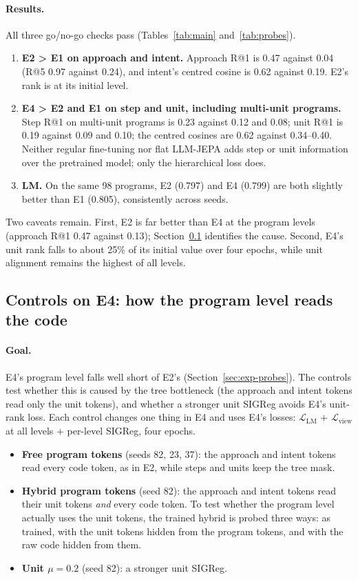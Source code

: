 \documentclass[11pt]{article}
\newcommand{\Lcal}{\mathcal{L}}
\begin{document}
\paragraph{Results.} All three go/no-go checks pass (Tables~\ref{tab:main} and~\ref{tab:probes}).
\begin{enumerate}
  \item \textbf{E2 > E1 on approach and intent.} Approach R@1 is 0.47 against 0.04 (R@5 0.97 against 0.24), and
        intent's centred cosine is 0.62 against 0.19. E2's rank is at its initial level.
  \item \textbf{E4 > E2 and E1 on step and unit, including multi-unit programs.} Step R@1 on multi-unit programs is
        0.23 against 0.12 and 0.08; unit R@1 is 0.19 against 0.09 and 0.10; the centred cosines are 0.62 against
        0.34--0.40. Neither regular fine-tuning nor flat LLM-JEPA adds step or unit information over the pretrained
        model; only the hierarchical loss does.
  \item \textbf{LM.} On the same 98 programs, E2 (0.797) and E4 (0.799) are both slightly better than E1 (0.805),
        consistently across seeds.
\end{enumerate}

Two caveats remain. First, E2 is far better than E4 at the program levels (approach R@1 0.47 against 0.13);
Section~\ref{sec:exp-controls} identifies the cause. Second, E4's unit rank falls to about 25\% of its initial value
over four epochs, while unit alignment remains the highest of all levels.

\subsection{Controls on E4: how the program level reads the code}
\label{sec:exp-controls}

\paragraph{Goal.} E4's program level falls well short of E2's (Section~\ref{sec:exp-probes}). The controls test
whether this is caused by the tree bottleneck (the approach and intent tokens read only the unit tokens), and
whether a stronger unit SIGReg avoids E4's unit-rank loss. Each control changes one thing in E4 and uses E4's
losses: $\Lcal_{\text{LM}}$ + $\Lcal_{\text{view}}$ at all levels + per-level SIGReg, four epochs.
\begin{itemize}
  \item \textbf{Free program tokens} (seeds 82, 23, 37): the approach and intent tokens read every code token, as
        in E2, while steps and units keep the tree mask.
  \item \textbf{Hybrid program tokens} (seed 82): the approach and intent tokens read their unit tokens \emph{and}
        every code token. To test whether the program level actually uses the unit tokens, the trained hybrid is
        probed three ways: as trained, with the unit tokens hidden from the program tokens, and with the raw code
        hidden from them.
  \item \textbf{Unit $\mu=0.2$} (seed 82): a stronger unit SIGReg.
\end{itemize}
\end{document}
